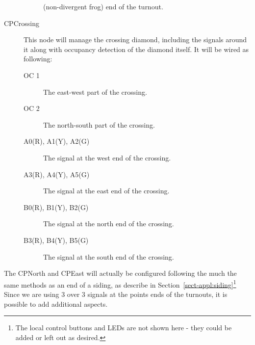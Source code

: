\begin{description}
\begin{description}
(non-divergent frog) end of the turnout.
\end{description} 
\item [CPCrossing] This node will manage the crossing diamond, including the 
signals around it along with occupancy detection of the diamond itself.  It 
will be wired as following: 
\begin{description}
\item [OC 1] The east-west part of the crossing.
\item [OC 2] The north-south part of the crossing.
\item [A0(R), A1(Y), A2(G)] The signal at the west end of the crossing.
\item [A3(R), A4(Y), A5(G)] The signal at the east end of the crossing.
\item [B0(R), B1(Y), B2(G)] The signal at the north end of the crossing.
\item [B3(R), B4(Y), B5(G)] The signal at the south end of the crossing.
\end{description}
\end{description}

The CPNorth and CPEast will actually be configured following the much the same 
methods as an end of a siding, as describe in 
Section~\ref{sect-appl:siding}\footnote{The local control buttons and LEDs are
not shown here - they could be added or left out as desired.} Since we are 
using 3 over 3 signals at the points ends of the turnouts, it is possible to 
add additional aspects. 


